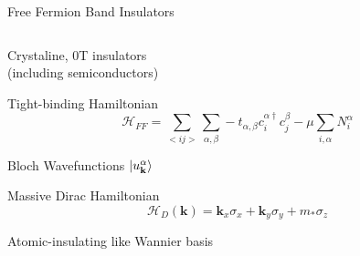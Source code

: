 \newcommand{\kk}{\mathbf{k}}
\begin{frame}{Free Fermion Band Insulators}
\vskip-1.5cm
\begin{columns}[T]
\begin{column}[T]{0.65\textwidth}
\bi 
\item Crystaline, 0T insulators \\(including semiconductors)
\item Tight-binding Hamiltonian 
$$
\mathcal{H}_{FF} =  \sum\limits_{<ij>}\sum\limits_{\alpha, \beta}-t_{\alpha, \beta} c^{\alpha \dagger}_{i} c_{j}^{\beta} - \mu \sum\limits_{i, \alpha} N_{i}^{\alpha} 
$$
\item Bloch Wavefunctions
$
\ket{u^{\alpha}_{\kk}}
$
\item Massive Dirac Hamiltonian 
$$
\mathcal{H}_{D}(\kk) = \kk_x \sigma_x + \kk_y \sigma_y + m_*\sigma_z
$$
\item Atomic-insulating like Wannier basis
\ei 
\end{column}


\end{columns}
\end{frame}

